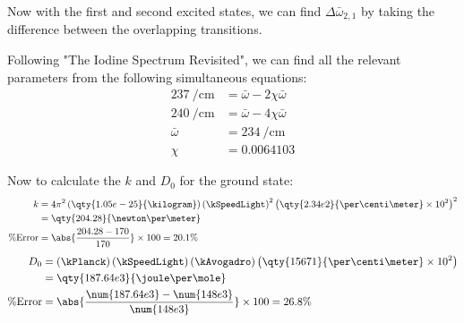 \documentclass[12pt]{article}
\begin{document}
\clearpage	
	
	Now with the first and second excited states, we can find $\Delta \bar{\omega}_{2,1}$ by taking the difference between the overlapping transitions.

	\begin{table}[htbp]
		\centering
		\caption{Energy Difference Between First and Second Excited States}
		\label{tab:DeltaFirstSecondStates}%
	\end{table}%
	
	Following "The Iodine Spectrum Revisited", we can find all the relevant parameters from the following simultaneous equations:
	\begin{align*}
		\qty{237}{\per\centi\meter} &= \bar{\omega} - 2\chi \bar{\omega} \\
		\qty{240}{\per\centi\meter} &= \bar{\omega} - 4\chi \bar{\omega} \\
		\bar{\omega} &= \qty{234}{\per\centi\meter} \\
		\chi &= 0.0064103
	\end{align*}
	
	Now to calculate the $k$ and $D_0$ for the ground state:
	\begin{align*}
		k &= 4 \pi^2 \left( \qty{1.05e-25}{\kilogram} \right) \left( \kSpeedLight \right)^2 \left( \qty{2.34e2}{\per\centi\meter} \times 10^2 \right)^2 \\
		&= \qty{204.28}{\newton\per\meter} \\
		\% \text{Error} &= \abs{\frac{204.28 - 170}{170}} \times 100 = 20.1 \%
	\end{align*}
	\begin{align*}
		D_0 &= \left( \kPlanck \right) \left( \kSpeedLight \right) \left( \kAvogadro \right) \left( \qty{15671}{\per\centi\meter} \times 10^2 \right) \\
		&= \qty{187.64e3}{\joule\per\mole} \\
		\% \text{Error} &= \abs{\frac{\num{187.64e3} - \num{148e3}}{\num{148e3}}} \times 100 = 26.8 \%
	\end{align*}
	
\end{document}
